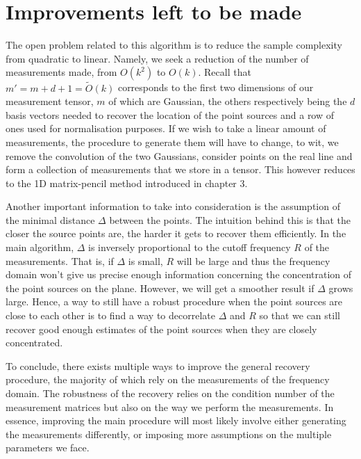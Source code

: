 \section{Improvements left to be made}
The open problem related to this algorithm is to reduce the sample complexity from quadratic to linear. Namely, we seek a reduction of the number of measurements made, from $O(k^2)$ to $O(k)$. Recall that $m'=m+d+1=\widetilde{O}(k)$ corresponds to the first two dimensions of our measurement tensor, $m$ of which are Gaussian, the others respectively being the $d$ basis vectors needed to recover the location of the point sources and a row of ones used for normalisation purposes. If we wish to take a linear amount of measurements, the procedure to generate them will have to change, to wit, we remove the convolution of the two Gaussians, consider points on the real line and form a collection of measurements that we store in a tensor. This however reduces to the 1D matrix-pencil method introduced in chapter 3.\par

Another important information to take into consideration is the assumption of the minimal distance $\Delta$ between the points. The intuition behind this is that the closer the source points are, the harder it gets to recover them efficiently. In the main algorithm, $\Delta$ is inversely proportional to the cutoff frequency $R$ of the measurements. That is, if $\Delta$ is small, $R$ will be large and thus the frequency domain won't give us precise enough information concerning the concentration of the point sources on the plane. However, we will get a smoother result if $\Delta$ grows large. Hence, a way to still have a robust procedure when the point sources are close to each other is to find a way to decorrelate $\Delta$ and $R$ so that we can still recover good enough estimates of the point sources when they are closely concentrated.\par

To conclude, there exists multiple ways to improve the general recovery procedure, the majority of which rely on the measurements of the frequency domain. The robustness of the recovery relies on the condition number of the measurement matrices but also on the way we perform the measurements. In essence, improving the main procedure will most likely involve either generating the measurements differently, or imposing more assumptions on the multiple parameters we face.